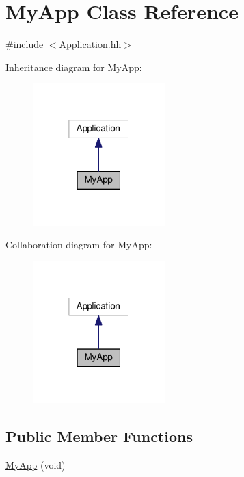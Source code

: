 \hypertarget{classMyApp}{}\section{My\+App Class Reference}
\label{classMyApp}


{\ttfamily \#include $<$Application.\+hh$>$}



Inheritance diagram for My\+App\+:
\nopagebreak
\begin{figure}[H]
\begin{center}
\leavevmode
\includegraphics[width=145pt]{classMyApp__inherit__graph}
\end{center}
\end{figure}


Collaboration diagram for My\+App\+:
\nopagebreak
\begin{figure}[H]
\begin{center}
\leavevmode
\includegraphics[width=145pt]{classMyApp__coll__graph}
\end{center}
\end{figure}
\subsection*{Public Member Functions}
\begin{DoxyCompactItemize}
\item 
\hyperlink{classMyApp_a9a9841f1e420ab6de44d3dc1fff55ec6}{My\+App} (void)
\end{DoxyCompactItemize}


